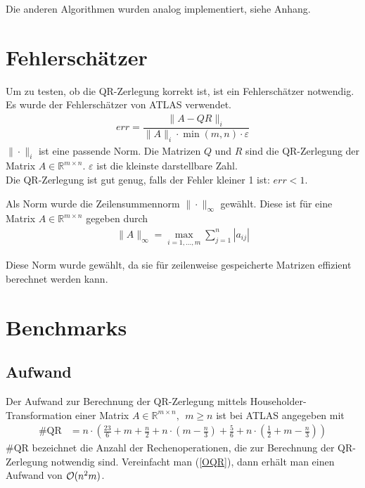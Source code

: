 Die anderen Algorithmen wurden analog implementiert, siehe Anhang.

\section{Fehlerschätzer} \label{Fehlerschätzer}

Um zu testen, ob die QR-Zerlegung korrekt ist, ist ein Fehlerschätzer notwendig.
Es wurde der Fehlerschätzer von ATLAS \cite{atlas} verwendet.
\begin{align}
err = \dfrac{\|A - QR\|_i}{\|A\|_i \cdot \min(m,n) \cdot \varepsilon}
\end{align}
$\|\cdot\|_i$ ist eine passende Norm.
Die Matrizen $Q$ und $R$ sind die QR-Zerlegung der Matrix $A \in \mathbb{R}^{m \times n}$.
$\varepsilon$ ist die kleinste darstellbare Zahl.\\
Die QR-Zerlegung ist gut genug, falls der Fehler kleiner 1 ist: $ err < 1 $.

Als Norm wurde die Zeilensummennorm $\|\cdot\|_\infty$ gewählt.
Diese ist für eine Matrix $A \in \mathbb{R}^{m\times n}$ gegeben durch
\begin{align*}
\|A\|_\infty = \max_{i=1,...,m} \sum_{j=1}^{n} |a_{ij}|
\end{align*}

Diese Norm wurde gewählt, da sie für zeilenweise gespeicherte Matrizen effizient berechnet werden kann.

\section{Benchmarks}
\newpage
\subsection{Aufwand} \label{aufwand}

Der Aufwand zur Berechnung der QR-Zerlegung mittels Householder-Transformation einer Matrix $A \in \mathbb{R}^{m \times n},~~ m \ge n$ ist bei ATLAS \cite{atlas} angegeben mit
\begin{align}
\#\text{QR} &= n\cdot\left( \frac{23}{6}+m+\frac{n}{2} + n\cdot\left(m-\frac{n}{3}\right) + \frac{5}{6} + n\cdot\left(\frac{1}{2} + m-\frac{n}{3}\right) \right) 
\label{OQR}
\end{align}
$\#\text{QR}$ bezeichnet die Anzahl der Rechenoperationen, die zur Berechnung der QR-Zerlegung notwendig sind. 
Vereinfacht man (\ref{OQR}), dann erhält man einen Aufwand von $ {\cal O}(n^2m)$.




